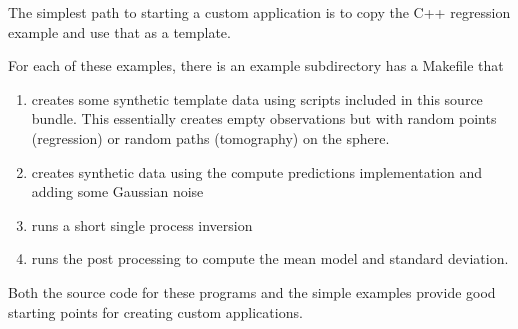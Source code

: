 \documentclass[a4paper,12pt]{article}
\begin{document}
The simplest path to starting a custom application is to copy 
the C++ regression example and use that as
a template.

For each of these examples, there is an example subdirectory
has a Makefile that

\begin{enumerate}
\item creates some synthetic template data using scripts included in this source
  bundle. This essentially creates empty observations but with random points (regression) or
  random paths (tomography) on the sphere.
\item creates synthetic data using the compute predictions implementation and adding
  some Gaussian noise
\item runs a short single process inversion
\item runs the post processing to compute the mean model and standard deviation.
\end{enumerate}

Both the source code for these programs and the simple examples provide good
starting points for creating custom applications.




\end{document}
